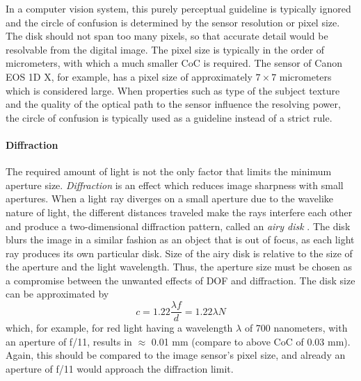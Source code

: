 In a computer vision system, this purely perceptual guideline is typically ignored and the circle of confusion is determined by the sensor resolution or pixel size.
The disk should not span too many pixels, so that accurate detail would be resolvable from the digital image.
The pixel size is typically in the order of micrometers, with which a much smaller CoC is required.
The sensor of Canon EOS 1D X, for example, has a pixel size of approximately $7 \times 7$ micrometers \cite{eos1dx} which is considered large.
When properties such as type of the subject texture and the quality of the optical path to the sensor influence the resolving power, the circle of confusion is typically used as a guideline instead of a strict rule.


\paragraph{Diffraction}
The required amount of light is not the only factor that limits the minimum aperture size.
\emph{Diffraction} is an effect which reduces image sharpness with small apertures.
When a light ray diverges on a small aperture due to the wavelike nature of light, the different distances traveled make the rays interfere each other and produce a two-dimensional diffraction pattern, called an \emph{airy disk} \cite[ch.~4]{greenleaf1950photographic}.
The disk blurs the image in a similar fashion as an object that is out of focus, as each light ray produces its own particular disk.
Size of the airy disk is relative to the size of the aperture and the light wavelength.
Thus, the aperture size must be chosen as a compromise between the unwanted effects of DOF and diffraction.
The disk size can be approximated \cite[p.~29]{greenleaf1950photographic} by
\begin{equation} \label{eq:airydisk}
	c = 1.22 \frac{\lambda f}{d} = 1.22 \lambda N
\end{equation}
which, for example, for red light having a wavelength $\lambda$ of 700 nanometers, with an aperture of f/11, results in $\approx$ 0.01 mm (compare to above CoC of 0.03 mm).
Again, this should be compared to the image sensor's pixel size, and already an aperture of f/11 would approach the diffraction limit.

